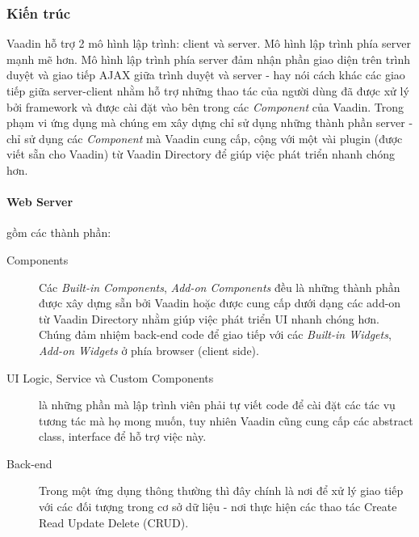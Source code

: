 \subsubsection{Kiến trúc}
Vaadin hỗ trợ 2 mô hình lập trình: client và server. Mô hình lập trình phía server mạnh mẽ hơn. Mô hình lập trình phía server đảm nhận phần giao diện trên trình duyệt và giao tiếp AJAX giữa trình duyệt và server - hay nói cách khác các giao tiếp giữa server-client nhằm hỗ trợ những thao tác của người dùng đã được xử lý bởi framework và được cài đặt vào bên trong các \textit{Component} của Vaadin. Trong phạm vi ứng dụng mà chúng em xây dựng chỉ sử dụng những thành phần server - chỉ sử dụng các \textit{Component} mà Vaadin cung cấp, cộng với một vài plugin (được viết sẵn cho Vaadin) từ Vaadin Directory \cite{vaadindirectory} để giúp việc phát triển nhanh chóng hơn. 

\paragraph{Web Server} gồm các thành phần:
\begin{description}
	\item[Components] Các \textit{Built-in Components}, \textit{Add-on Components} đều là những thành phần được xây dựng sẵn bởi Vaadin hoặc được cung cấp dưới dạng các add-on từ Vaadin Directory \cite{vaadindirectory} nhằm giúp việc phát triển UI nhanh chóng hơn. Chúng đảm nhiệm back-end code để giao tiếp với các \textit{Built-in Widgets}, \textit{Add-on Widgets} ở phía browser (client side).
	\item[UI Logic, Service và Custom Components] là những phần mà lập trình viên phải tự viết code để cài đặt các tác vụ tương tác mà họ mong muốn, tuy nhiên Vaadin cũng cung cấp các abstract class, interface để hỗ trợ việc này. 
	\item[Back-end] Trong một ứng dụng thông thường thì đây chính là nơi để xử lý giao tiếp với các đối tượng trong cơ sở dữ liệu - nơi thực hiện các thao tác Create Read Update Delete (CRUD).
\end{description}
